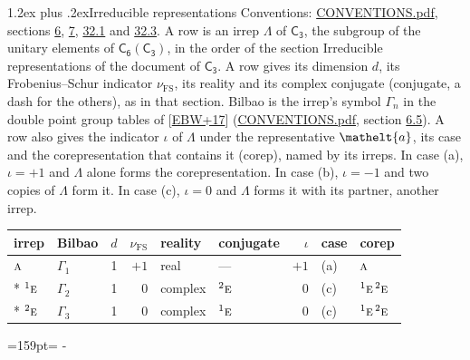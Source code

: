 \documentclass[10pt,a4paper]{article}
\makeatletter
\renewcommand\section{\@startsection{section}{1}{\z@}{-3ex plus -1ex minus -.2ex}%
  {1.2ex plus .2ex}{\normalfont\large\sffamily\bfseries\color{parttitle}}}
\newcommand{\needspace}[1]{\par\penalty-100\begingroup\dimen0=#1\relax\dimen2=\pagegoal
  \advance\dimen2-\pagetotal\ifdim\dimen0>\dimen2\relax\ifdim\dimen2>0pt\vfil\break\fi\fi
  \endgroup}
\numberwithin{equation}{section}
\newcommand{\eltfont}[1]{{\let\sigma\eltsigma\mathelt{#1}}}
\newcommand{\grp}[1]{\mathsf{#1}}
\newcommand{\irr}[1]{\text{\normalfont\scshape #1}}
\newcommand{\conjpair}[1]{{}^{#1}}
\newcommand{\elt}[1]{\eltfont{#1}}
\newcommand{\fsind}{\nu_{\mathrm{FS}}}
\makeatother
\begin{document}
\section{Irreducible representations}\label{s:irreps}
Conventions: \href{../../CONVENTIONS.pdf}{CONVENTIONS.pdf}, sections \href{../../../rotation/CONVENTIONS.pdf\#conv.6}{6}, \href{../../../rotation/CONVENTIONS.pdf\#conv.7}{7}, \href{../../CONVENTIONS.pdf\#conv.32.1}{32.1} and \href{../../CONVENTIONS.pdf\#conv.32.3}{32.3}.
\leavevmode\label{n:irrep.Delta}A row is an irrep $\Lambda$ of $\grp{C_{3}}$, the subgroup of the unitary elements of $\grp{C_{6}}(\grp{C_{3}})$, in the order of the section Irreducible representations of the document of \href{../../../rotation/data/pdf/C3.pdf}{$\grp{C_{3}}$}. \label{n:index.dimension}\label{n:index.frobenius}\label{n:head.irrep}\label{n:head.reality}\label{n:head.conjugate}A row gives its dimension $d$, its Frobenius--Schur indicator $\fsind$, its reality and its complex conjugate (conjugate, a dash for the others), as in that section. \label{n:head.bilbao}\label{n:irrep.alias.gamma}Bilbao is the irrep's symbol $\Gamma_n$ in the double point group tables of [\href{../../../REFERENCES.pdf\#ref.EBW+17}{EBW+17}] (\href{../../CONVENTIONS.pdf}{CONVENTIONS.pdf}, section \href{../../../rotation/CONVENTIONS.pdf\#conv.6.5}{6.5}). \label{n:head.case.corep}\label{n:head.corep}A row also gives the indicator $\iota$ of $\Lambda$ under the representative $\elt{a}$, its case and the corepresentation that contains it (corep), named by its irreps. In case (a), $\iota = +1$ and $\Lambda$ alone forms the corepresentation. In case (b), $\iota = -1$ and two copies of $\Lambda$ form it. In case (c), $\iota = 0$ and $\Lambda$ forms it with its partner, another irrep.
\setlength{\emergencystretch}{2em}\par\setlength{\emergencystretch}{0pt}
{\small\renewcommand{\arraystretch}{1.25}\setlength{\tabcolsep}{4pt}\begin{longtable}{@{}llrrllrll@{}}\toprule
irrep & Bilbao & $d$ & $\fsind$ & reality & conjugate & $\iota$ & case & corep\\\midrule\endhead
\bottomrule\endfoot\endlastfoot
$\irr{a}$ & $\Gamma_{1}$ & 1 & $+1$ & real & --- & $+1$ & (a) & $\irr{a}$\\*
$\conjpair{1}\irr{e}$ & $\Gamma_{2}$ & 1 & $0$ & complex & $\conjpair{2}\irr{e}$ & $0$ & (c) & $\conjpair{1}\irr{e}\,\conjpair{2}\irr{e}$\\*
$\conjpair{2}\irr{e}$ & $\Gamma_{3}$ & 1 & $0$ & complex & $\conjpair{1}\irr{e}$ & $0$ & (c) & $\conjpair{1}\irr{e}\,\conjpair{2}\irr{e}$\\
\bottomrule\end{longtable}}
\needspace{159pt}
\end{document}
